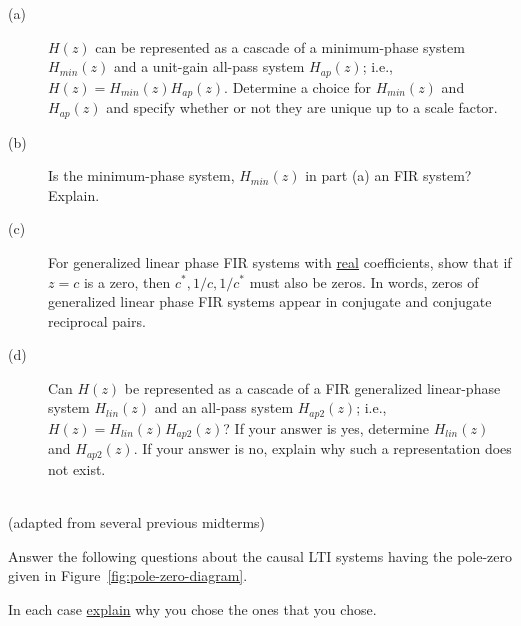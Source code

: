 \documentclass[12pt]{report}
\begin{document}
\begin{description}
	\item[(a)] $H(z)$ can be represented as a cascade of a minimum-phase system $H_{min}(z)$ and a unit-gain all-pass system $H_{ap}(z)$; i.e., $H(z) = H_{min}(z)H_{ap}(z)$. Determine a choice for $H_{min}(z)$ and $H_{ap}(z)$ and specify whether or not they are unique up to a scale factor.
	\item[(b)] Is the minimum-phase system, $H_{min}(z)$ in part (a) an FIR system? Explain.
	\item[(c)] For generalized linear phase FIR systems with \underline{real} coefficients, show that if $z = c$ is a zero, then $c^*, 1/c, 1/c^*$ must also be zeros. In words, zeros of generalized linear phase FIR systems appear in conjugate and conjugate reciprocal pairs.
	\item[(d)] Can $H(z)$ be represented as a cascade of a FIR generalized linear-phase system $H_{lin}(z)$ and an all-pass system $H_{ap2}(z)$; i.e., $H(z) = H_{lin}(z)H_{ap2}(z)$? If your answer is yes, determine $H_{lin}(z)$ and $H_{ap2}(z)$. If your answer is no, explain why such a representation does not exist.
\end{description}

\mbox{}\\ 
 (adapted from several previous midterms)

Answer the following questions about the causal LTI systems having the pole-zero given in Figure~\ref{fig:pole-zero-diagram}.

In each case \underline{explain} why you chose the ones that you chose.
\end{document}
